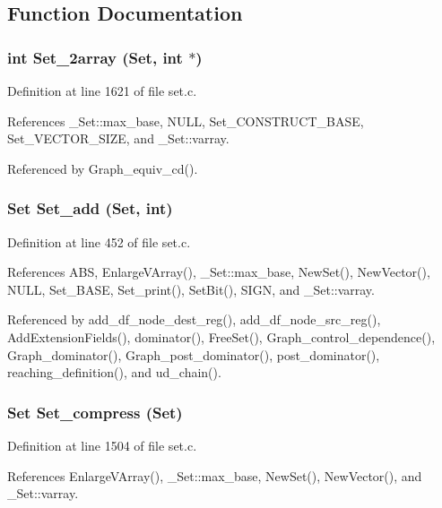 \subsection{Function Documentation}
\subsubsection{\setlength{\rightskip}{0pt plus 5cm}int Set\_\-2array (\bf{Set}, int $\ast$)}\label{set_8h_eaedea3101ecbcae0c42459018d54823}




Definition at line 1621 of file set.c.

References \_\-Set::max\_\-base, NULL, Set\_\-CONSTRUCT\_\-BASE, Set\_\-VECTOR\_\-SIZE, and \_\-Set::varray.

Referenced by Graph\_\-equiv\_\-cd().
\subsubsection{\setlength{\rightskip}{0pt plus 5cm}\bf{Set} Set\_\-add (\bf{Set}, int)}\label{set_8h_b4825ed02aca78728f7cb15db724abbe}




Definition at line 452 of file set.c.

References ABS, Enlarge\-VArray(), \_\-Set::max\_\-base, New\-Set(), New\-Vector(), NULL, Set\_\-BASE, Set\_\-print(), Set\-Bit(), SIGN, and \_\-Set::varray.

Referenced by add\_\-df\_\-node\_\-dest\_\-reg(), add\_\-df\_\-node\_\-src\_\-reg(), Add\-Extension\-Fields(), dominator(), Free\-Set(), Graph\_\-control\_\-dependence(), Graph\_\-dominator(), Graph\_\-post\_\-dominator(), post\_\-dominator(), reaching\_\-definition(), and ud\_\-chain().
\subsubsection{\setlength{\rightskip}{0pt plus 5cm}\bf{Set} Set\_\-compress (\bf{Set})}\label{set_8h_07b66b61a3b8fc6cc6fcb190f7336b24}




Definition at line 1504 of file set.c.

References Enlarge\-VArray(), \_\-Set::max\_\-base, New\-Set(), New\-Vector(), and \_\-Set::varray.
